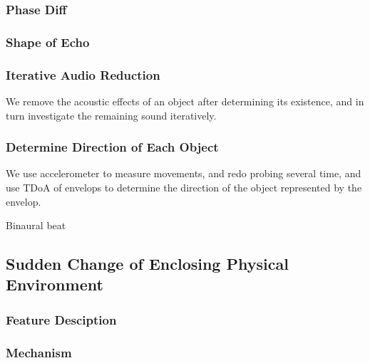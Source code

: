 \subsubsection{Phase Diff}



\subsubsection{Shape of Echo}



\subsubsection{Iterative Audio Reduction}

We remove the acoustic effects of an object after determining its existence, and 
in turn investigate the remaining sound iteratively. 


\subsubsection{Determine Direction of Each Object}

We use accelerometer to measure movements, and redo probing several time, and 
use TDoA of envelops to determine the direction of the object represented by the envelop.


Binaural beat


\subsection{Sudden Change of Enclosing Physical Environment}

\subsubsection{Feature Desciption}

\subsubsection{Mechanism}
